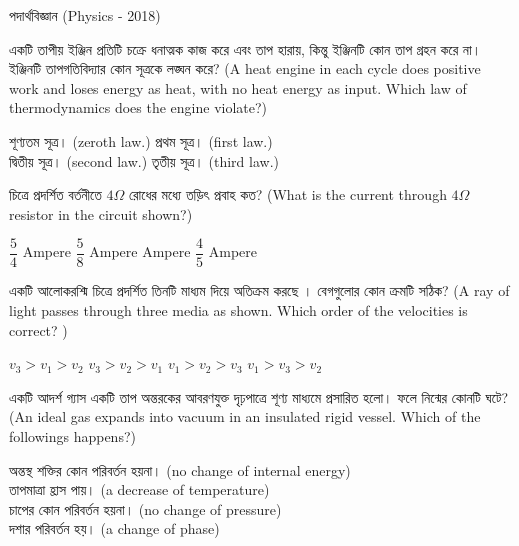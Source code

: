 \documentclass[addpoints]{exam}
\begin{document}
\begin{LARGE}
\begin{center}
পদার্থবিজ্ঞান (Physics - 2018)
\end{center}
\end{LARGE}
\begin{questions}

\question  একটি তাপীয় ইঞ্জিন প্রতিটি চক্রে ধনাত্মক কাজ করে এবং তাপ হারায়, কিন্তু ইঞ্জিনটি কোন তাপ গ্রহন করে না। ইঞ্জিনটি তাপগতিবিদ্যার কোন সূত্রকে লঙ্ঘন করে? (A heat engine in each cycle does positive work and loses energy as heat, with no heat energy as input. Which law of thermodynamics does the engine violate?)

\begin{oneparchoices}
\choice শূণ্যতম সূত্র। (zeroth law.)
\choice প্রথম সূত্র। (first law.)\\
\hspace*{-.33cm}\choice দ্বিতীয় সূত্র। (second law.)
\hspace*{.1cm}\choice তৃতীয় সূত্র। (third law.)
\end{oneparchoices}

 \question  চিত্রে প্রদর্শিত বর্তনীতে $ 4\Omega $ রোধের মধ্যে তড়িৎ প্রবাহ কত? (What is the current through $ 4\Omega $ resistor in the circuit shown?)

\begin{oneparchoices}
\choice $ \dfrac{5}{4} $ Ampere
\choice $ \dfrac{5}{8} $ Ampere
 Ampere
\choice $ \dfrac{4}{5} $ Ampere

\end{oneparchoices}

\question  একটি আলোকরশ্মি চিত্রে প্রদর্শিত তিনটি মাধ্যম দিয়ে অতিক্রম করছে । বেগগুলোর কোন ক্রমটি সঠিক? (A ray of light passes through three media as shown. Which order of the velocities is correct? )

\begin{oneparchoices}
\choice $ v_{3}>v_{1}>v_{2}$
\choice $ v_{3}>v_{2}>v_{1}$
\choice $ v_{1}>v_{2}>v_{3}$
\choice $ v_{1}>v_{3}>v_{2}$

\end{oneparchoices}

\question  একটি আদর্শ গ্যাস একটি তাপ অন্তরকের আবরণযুক্ত দৃঢ়পাত্রে শূণ্য মাধ্যমে প্রসারিত হলো। ফলে নিন্মের কোনটি ঘটে? (An ideal gas expands into vacuum in an insulated rigid vessel. Which of the followings happens?)

\begin{oneparchoices}
\choice অন্তস্থ শক্তির কোন পরিবর্তন হয়না। (no change of internal energy) \\
\choice তাপমাত্রা হ্রাস পায়। (a decrease of temperature)\\ 
\choice চাপের কোন পরিবর্তন হয়না। (no change of pressure)\\
\choice দশার পরিবর্তন হয়। (a change of phase)
\end{oneparchoices}


\end{questions}
\end{document}
